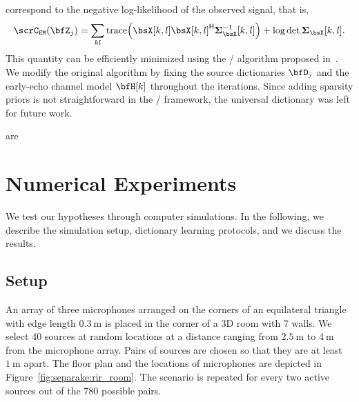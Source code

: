  correspond to the negative log-likelihood of the observed signal, that is,
\begin{equation}
    \scrC_{\mathtt{EM}}(\mZ_\idxSrc) = \sum\limits_{kl} \trace\kparen{\MICS[k,l] \khermitian{\MICS[k,l]} \mSigma_{\MICS}^{-1}[k,l]} \\
    + \log\det\mSigma_{\MICS}[k,l].
\end{equation}
This quantity can be efficiently minimized using the \EM/ algorithm proposed in~.
We modify the original algorithm by fixing the source dictionaries $\mD_\idxSrc$ and the early-echo channel model $\FLTSS[k]$ throughout the iterations.
Since adding sparsity priors is not straightforward in the \EM/ framework, the universal dictionary was left for future work.

 are


\section{Numerical Experiments}

We test our hypotheses through computer simulations.
In the following, we describe the simulation setup, dictionary learning protocols, and we discuss the results.

\subsection{Setup}
An array of three microphones arranged on the corners of an equilateral triangle with edge length $\SI{0.3}{\m}$ is placed in the corner of a 3D room with 7 walls.
We select 40 sources at random locations at a distance ranging from $\SI{2.5}{\m}$ to $\SI{4}{\m}$ from the microphone array.
Pairs of sources are chosen so that they are at least $\SI{1}{\m}$ apart.
The floor plan and the locations of microphones are depicted in Figure~\ref{fig:separake:rir_room}.
The scenario is repeated for every two active sources out of the 780 possible pairs.

